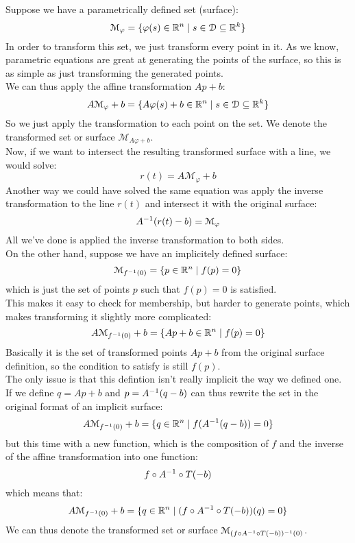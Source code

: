 \documentclass[12pt]{article}
\begin{document}
Suppose we have
a parametrically defined set (surface):
\[ \mathcal{M}_\varphi = 
\{ \varphi(s) \in \mathbb{R}^n \mid 
s \in \mathcal{D} \subseteq \mathbb{R}^k \} \]
In order to transform this set,
we just transform every point in it.
As we know, parametric equations are great at
generating the points of the surface,
so this is as simple as just transforming the
generated points. \\
We can thus apply the affine transformation $Ap + b$:
\[ A\mathcal{M}_\varphi + b
= \{ A\varphi(s) + b\in \mathbb{R}^n \mid 
s \in \mathcal{D} \subseteq \mathbb{R}^k \} \]
So we just apply the transformation
to each point on the set.
We denote the transformed set or surface
$\mathcal{M}_{A\varphi + b}$. \\

Now, if we want to intersect the resulting
transformed surface with a line,
we would solve:
\[ r(t) = A\mathcal{M}_\varphi + b \]
Another way we could have solved the same
equation was apply the inverse transformation
to the line $r(t)$
and intersect it with the original surface:
\[ A^{-1}(r(t) - b) = \mathcal{M}_\varphi \]
All we've done is applied the inverse transformation
to both sides. \\

On the other hand, suppose we have an implicitely
defined surface:
\[ \mathcal{M}_{f^{-1}(0)}
= \{ p \in \mathbb{R}^n \mid f(p) =0 \} \]
which is just the set of points $p$
such that $f(p) = 0$ is satisfied. \\
This makes it easy to check for membership,
but harder to generate points,
which makes transforming it slightly more
complicated:
\[ A\mathcal{M}_{f^{-1}(0)} + b
= \{ Ap + b \in \mathbb{R}^n \mid f(p) =0 \} \]
Basically it is the set of transformed points 
$Ap + b$ from the original surface definition,
so the condition to satisfy is still $f(p)$. \\
The only issue is that this defintion isn't
really implicit the way we defined one. \\
If we define $q = Ap + b$
and $p = A^{-1}(q - b)$ can thus rewrite
the set in the original format of
an implicit surface:
\[ A\mathcal{M}_{f^{-1}(0)} + b
= \{ q \in \mathbb{R}^n \mid f(A^{-1}(q - b)) = 0 \} \]
but this time with a new function,
which is the composition of $f$ and the inverse of the
affine transformation into one function:
\[ f \circ A^{-1} \circ T(-b) \]
which means that:
\[ A\mathcal{M}_{f^{-1}(0)} + b
= \{ q \in \mathbb{R}^n \mid 
(f \circ A^{-1} \circ T(-b))(q) = 0 \} \]
We can thus denote the transformed set or surface
$\mathcal{M}_{(f \circ A^{-1} \circ T(-b))^{-1}(0)}$. \\
\end{document}
